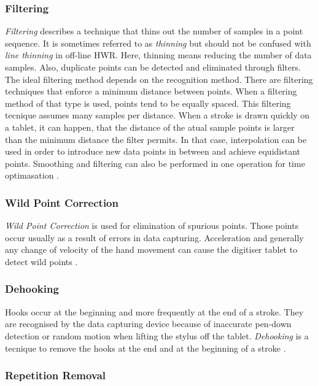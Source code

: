 \subsubsection{Filtering}
\label{sec:filtering}
\emph{Filtering} describes a technique that thins out the number of samples in 
a point sequence. It is sometimes referred to as \emph{thinning} but should not 
be confused with \emph{line thinning} in off-line HWR. Here, thinning means 
reducing the number of data samples. Also, duplicate points can be detected
and eliminated through filters.
The ideal filtering method depends on the recognition method. There are 
filtering techniques that enforce a minimum distance between points. When a 
filtering method of that type is used, points tend to be equally spaced.
This filtering tecnique assumes many samples per distance. When a stroke is drawn
quickly on a tablet, it can happen, that the distance of the atual sample 
points is larger than the minimum distance the filter permits. In that case,
interpolation can be used in order to introduce new data points in between and
achieve equidistant points. Smoothing and filtering can also be performed in one 
operation for time optimasation .

\subsubsection{Wild Point Correction}
\label{sec:wildpointcorrection}
\emph{Wild Point Correction} is used for elimination of spurious points. Those 
points occur usually as a result of errors in data capturing. Acceleration and 
generally any change of velocity of the hand movement can cause the digitiser 
tablet to detect wild points .

\subsubsection{Dehooking}
\label{sec:dehooking}
Hooks occur at the beginning and more frequently at the end of a stroke. They
are recognised by the data capturing device because of inaccurate pen-down 
detection or random motion when lifting the stylus off the tablet.
\emph{Dehooking} is a tecnique to remove the hooks at the end and at the 
beginning of a stroke .

\subsubsection{Repetition Removal}
\label{sec:repetitionremoval}

